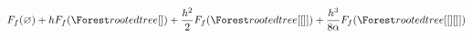 \documentclass[
  preview,
  border={0pt 1pt 0pt 1pt}, %
]{standalone}
\begin{document}
\(\displaystyle
F_{f}\mathopen{}\left( \varnothing \right)\mathclose{} + h F_{f}\mathopen{}\left( \rootedtree[] \right)\mathclose{} + \frac{h^{2}}{2} F_{f}\mathopen{}\left( \rootedtree[[]] \right)\mathclose{} + \frac{h^{3}}{8 \alpha} F_{f}\mathopen{}\left( \rootedtree[[][]] \right)\mathclose{}
\)
\end{document}
